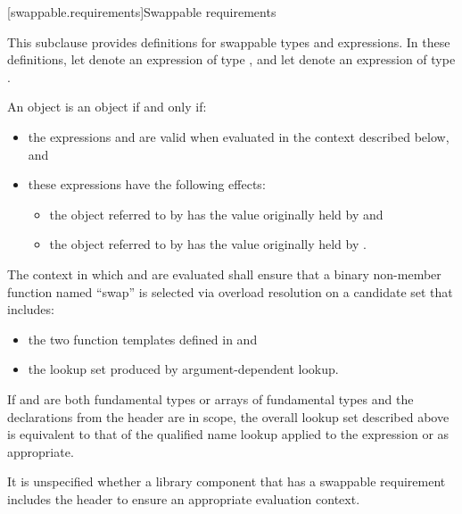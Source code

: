 [swappable.requirements]{Swappable requirements}

\pnum
This subclause provides definitions for swappable types and expressions. In these
definitions, let  denote an expression of type , and let 
denote an expression of type .

\pnum
An object  is  an object  if and only if:

\begin{itemize}
\item the expressions  and  are valid when
evaluated in the context described below, and

\item these expressions have the following effects:

\begin{itemize}
\item the object referred to by  has the value originally held by  and
\item the object referred to by  has the value originally held by .
\end{itemize}
\end{itemize}

\pnum
The context in which  and  are evaluated shall
ensure that a binary non-member function named ``swap'' is selected via overload
resolution on a candidate set that includes:

\begin{itemize}
\item the two  function templates defined in
 and

\item the lookup set produced by argument-dependent lookup.
\end{itemize}

\begin{note} If  and  are both fundamental types or arrays of
fundamental types and the declarations from the header  are in
scope, the overall lookup set described above is equivalent to that of the
qualified name lookup applied to the expression  or
 as appropriate. \end{note}

\begin{note} It is unspecified whether a library component that has a swappable
requirement includes the header  to ensure an appropriate
evaluation context. \end{note}

